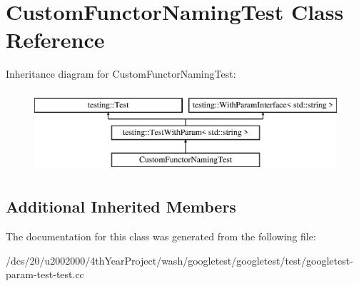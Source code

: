 \hypertarget{classCustomFunctorNamingTest}{}\section{Custom\+Functor\+Naming\+Test Class Reference}
\label{classCustomFunctorNamingTest}
Inheritance diagram for Custom\+Functor\+Naming\+Test\+:\begin{figure}[H]
\begin{center}
\leavevmode
\includegraphics[height=3.000000cm]{classCustomFunctorNamingTest}
\end{center}
\end{figure}
\subsection*{Additional Inherited Members}


The documentation for this class was generated from the following file\+:\begin{DoxyCompactItemize}
\item 
/dcs/20/u2002000/4th\+Year\+Project/wash/googletest/googletest/test/googletest-\/param-\/test-\/test.\+cc\end{DoxyCompactItemize}
